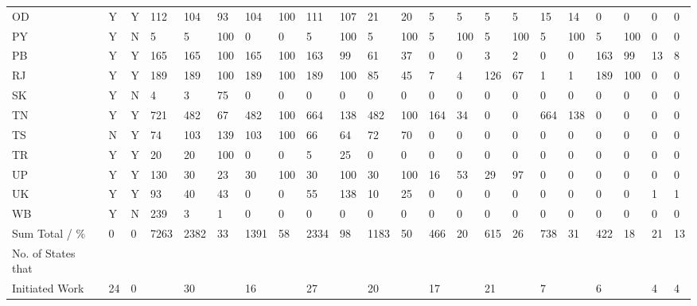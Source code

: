 \documentclass[a4paper, 12pt, twoside]{article}
\begin{document}
\begin{landscape}
\begin{longtable}{>{\raggedright}p{2cm}p{0.5cm}p{0.5cm}p{0.5cm}p{0.5cm}p{0.5cm}p{0.5cm}p{0.5cm}p{0.5cm}p{0.5cm}p{0.5cm}p{1.0cm}p{0.5cm}p{0.5cm}p{0.5cm}p{0.5cm}p{0.5cm}p{0.5cm}p{0.5cm}p{0.5cm}p{0.5cm}p{0.5cm}}
OD & Y & Y & 112 & 104 & 93 & 104 & 100 & 111 & 107 & 21 & 20 & 5 & 5 & 5 & 5 & 15 & 14 & 0 & 0 & 0 & 0 \\
PY & Y & N & 5 & 5 & 100 & 0 & 0 & 5 & 100 & 5 & 100 & 5 & 100 & 5 & 100 & 5 & 100 & 5 & 100 & 0 & 0 \\
PB & Y & Y & 165 & 165 & 100 & 165 & 100 & 163 & 99 & 61 & 37 & 0 & 0 & 3 & 2 & 0 & 0 & 163 & 99 & 13 & 8 \\
RJ & Y & Y & 189 & 189 & 100 & 189 & 100 & 189 & 100 & 85 & 45 & 7 & 4 & 126 & 67 & 1 & 1 & 189 & 100 & 0 & 0 \\
SK & Y & N & 4 & 3 & 75 & 0 & 0 & 0 & 0 & 0 & 0 & 0 & 0 & 0 & 0 & 0 & 0 & 0 & 0 & 0 & 0 \\
TN & Y & Y & 721 & 482 & 67 & 482 & 100 & 664 & 138 & 482 & 100 & 164 & 34 & 0 & 0 & 664 & 138 & 0 & 0 & 0 & 0 \\
TS & N & Y & 74 & 103 & 139 & 103 & 100 & 66 & 64 & 72 & 70 & 0 & 0 & 0 & 0 & 0 & 0 & 0 & 0 & 0 & 0 \\
TR & Y & Y & 20 & 20 & 100 & 0 & 0 & 5 & 25 & 0 & 0 & 0 & 0 & 0 & 0 & 0 & 0 & 0 & 0 & 0 & 0 \\
UP & Y & Y & 130 & 30 & 23 & 30 & 100 & 30 & 100 & 30 & 100 & 16 & 53 & 29 & 97 & 0 & 0 & 0 & 0 & 0 & 0 \\
UK & Y & Y & 93 & 40 & 43 & 0 & 0 & 55 & 138 & 10 & 25 & 0 & 0 & 0 & 0 & 0 & 0 & 0 & 0 & 1 & 1 \\
WB & Y & N & 239 & 3 & 1 & 0 & 0 & 0 & 0 & 0 & 0 & 0 & 0 & 0 & 0 & 0 & 0 & 0 & 0 & 0 & 0 \\
\midrule
Sum Total / \% & 0 & 0 & 7263 & 2382 & 33 & 1391 & 58 & 2334 & 98 & 1183 & 50 & 466 & 20 & 615 & 26 & 738 & 31 & 422 & 18 & 21 & 13 \\
No. of States that \\ Initiated Work & 24 & 0 &  & 30 &  & 16 &  & 27 &  & 20 &  & 17 &  & 21 &  & 7 &  & 6 &  & 4 & 4 \\

\end{longtable}
\end{landscape}
\normalsize	
\end{document}
